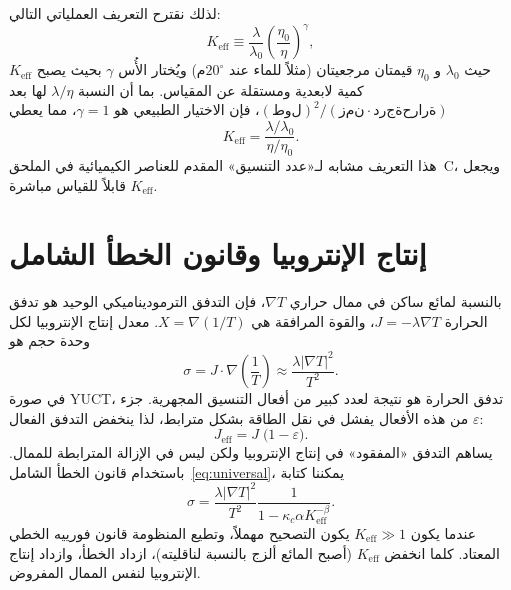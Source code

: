 \documentclass[12pt,a4paper]{article}
\begin{document}
	لذلك نقترح التعريف العملياتي التالي:
	\begin{equation}\label{eq:Keff-fluid}
		K_{\mathrm{eff}} \equiv \frac{\lambda}{\lambda_0} \left( \frac{\eta_0}{\eta} \right)^{\gamma},
	\end{equation}
	حيث \(\lambda_0\) و \(\eta_0\) قيمتان مرجعيتان (مثلاً للماء عند $20^\circ$م) ويُختار الأُس \(\gamma\) بحيث يصبح \(K_{\mathrm{eff}}\) كمية لابعدية ومستقلة عن المقياس. بما أن النسبة \(\lambda/\eta\) لها بعد \((\mathrm{طول})^2/(\mathrm{زمن}\cdot\mathrm{درجة حرارة})\)، فإن الاختيار الطبيعي هو \(\gamma = 1\)، مما يعطي
	\begin{equation}\label{eq:Keff-fluid2}
		K_{\mathrm{eff}} = \frac{\lambda / \lambda_0}{\eta / \eta_0}.
	\end{equation}
	هذا التعريف مشابه لـ«عدد التنسيق» المقدم للعناصر الكيميائية في الملحق~C، ويجعل \(K_{\mathrm{eff}}\) قابلاً للقياس مباشرة.
	
	\section{إنتاج الإنتروبيا وقانون الخطأ الشامل}
	بالنسبة لمائع ساكن في ممال حراري \(\nabla T\)، فإن التدفق الترموديناميكي الوحيد هو تدفق الحرارة \(J = -\lambda \nabla T\)، والقوة المرافقة هي \(X = \nabla(1/T)\). معدل إنتاج الإنتروبيا لكل وحدة حجم هو
	\begin{equation}\label{eq:sigma}
		\sigma = J \cdot \nabla\left(\frac{1}{T}\right) \approx \frac{\lambda |\nabla T|^2}{T^2}.
	\end{equation}
	في صورة YUCT، تدفق الحرارة هو نتيجة لعدد كبير من أفعال التنسيق المجهرية. جزء \(\varepsilon\) من هذه الأفعال يفشل في نقل الطاقة بشكل مترابط، لذا ينخفض التدفق الفعال:
	\begin{equation}\label{eq:J-effective}
		J_{\mathrm{eff}} = J \; \bigl(1 - \varepsilon\bigr).
	\end{equation}
	يساهم التدفق «المفقود» في إنتاج الإنتروبيا ولكن ليس في الإزالة المترابطة للممال. باستخدام قانون الخطأ الشامل~\eqref{eq:universal}، يمكننا كتابة
	\begin{equation}\label{eq:sigma-K}
		\sigma = \frac{\lambda |\nabla T|^2}{T^2} \frac{1}{1 - \kappa_c\alpha K_{\mathrm{eff}}^{-\beta}}.
	\end{equation}
	عندما يكون \(K_{\mathrm{eff}} \gg 1\) يكون التصحيح مهملاً، وتطيع المنظومة قانون فورييه الخطي المعتاد. كلما انخفض \(K_{\mathrm{eff}}\) (أصبح المائع ألزج بالنسبة لناقليته)، ازداد الخطأ، وازداد إنتاج الإنتروبيا لنفس الممال المفروض.
	
\end{document}
